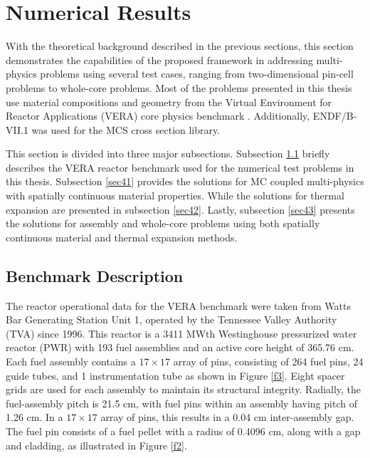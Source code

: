 \newpage 
\section{Numerical Results} \label{s4}
With the theoretical background described in the previous sections, this section demonstrates the capabilities of the proposed framework in addressing multi-physics problems using several test cases, ranging from two-dimensional pin-cell problems to whole-core problems. Most of the problems presented in this thesis use material compositions and geometry from the Virtual Environment for Reactor Applications (VERA) core physics benchmark \cite{godfrey}. Additionally, ENDF/B-VII.1 was used for the MCS cross section library.

This section is divided into three major subsections. Subsection \ref{sec40} briefly describes the VERA reactor benchmark used for the numerical test problems in this thesis. Subsection \ref{sec41} provides the solutions for MC coupled multi-physics with spatially continuous material properties. While the solutions for thermal expansion are presented in subsection \ref{sec42}. Lastly, subsection \ref{sec43} presents the solutions for assembly and whole-core problems using both spatially continuous material and thermal expansion methods.

\subsection{Benchmark Description} \label{sec40}

The reactor operational data for the VERA benchmark were taken from Watts Bar Generating Station Unit 1, operated by the Tennessee Valley Authority (TVA) since 1996. This reactor is a 3411 MWth Westinghouse pressurized water reactor (PWR) with 193 fuel assemblies and an active core height of 365.76 cm. Each fuel assembly contains a \(17 \times 17\) array of pins, consisting of 264 fuel pins, 24 guide tubes, and 1 instrumentation tube as shown in Figure \ref{f3}. Eight spacer grids are used for each assembly to maintain its structural integrity. Radially, the fuel-assembly pitch is 21.5 cm, with fuel pins within an assembly having pitch of 1.26 cm. In a \(17 \times 17\) array of pins, this results in a 0.04 cm inter-assembly gap. The fuel pin consists of a fuel pellet with a radius of 0.4096 cm, along with a gap and cladding, as illustrated in Figure \ref{f2}.

